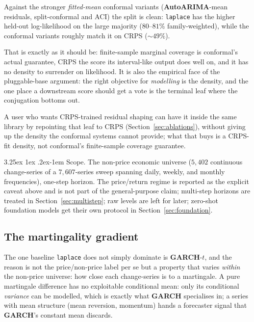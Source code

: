 \documentclass[article]{jss}
\makeatletter
\renewcommand\paragraph{\@startsection{paragraph}{4}{\z@}%
  {3.25ex \@plus1ex \@minus.2ex}{-1em}%
  {\normalfont\normalsize\itshape}}
\providecommand{\pkg}[1]{\textbf{#1}}
\providecommand{\code}[1]{\texttt{#1}}
\makeatother
\begin{document}
Against the stronger
\emph{fitted-mean} conformal variants (\pkg{AutoARIMA}-mean residuals,
split-conformal and ACI) the split is clean: \code{laplace} has the
higher held-out log-likelihood on the large majority ($80$--$81\%$
family-weighted), while the conformal variants roughly match it on CRPS
($\sim 49\%$).

That is exactly as it should be: finite-sample marginal coverage is
conformal's actual guarantee, CRPS the score its interval-like output does well
on, and it has no density to surrender on likelihood. It is also the
empirical face of the pluggable-base argument: the
right objective for \emph{modelling} is the density, and the one place a
downstream score should get a vote is the terminal leaf where the conjugation
bottoms out.

A user who wants CRPS-trained
residual shaping can have it inside the same library by repointing that leaf to
CRPS (Section~\ref{sec:ablations}), without giving up the density the conformal
systems cannot provide; what that buys is a CRPS-fit density, not conformal's
finite-sample coverage guarantee.

\paragraph{Scope.}
The non-price economic universe ($5{,}402$ continuous change-series of a
$7{,}607$-series sweep spanning daily, weekly, and monthly frequencies), one-step
horizon. The price/return regime is reported as the explicit caveat
above and is not part of the general-purpose claim; multi-step horizons are
treated in Section~\ref{sec:multistep}; raw levels are left for later; zero-shot
foundation models get their own protocol in Section~\ref{sec:foundation}.

\subsection{The martingality gradient} \label{sec:martingality}

The one baseline \code{laplace} does not simply dominate is \pkg{GARCH}-$t$, and
the reason is not the price/non-price label per se but a property that varies
\emph{within} the non-price universe: how close each change-series is to a
martingale. A pure martingale difference has no exploitable conditional mean:
only its conditional \emph{variance} can be modelled, which is exactly what
\pkg{GARCH} specialises in; a series with mean structure (mean reversion,
momentum) hands a forecaster signal that \pkg{GARCH}'s constant mean discards.
\end{document}
